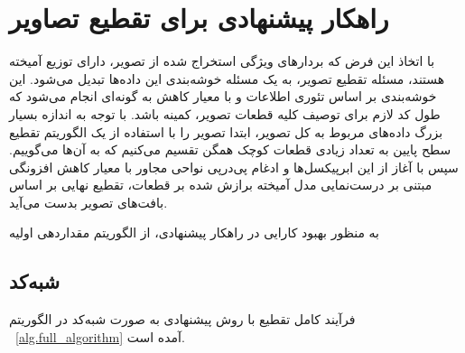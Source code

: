 \chapter{راهکار پیشنهادی برای تقطیع تصاویر}
\label{ch:proposedMethod}
با اتخاذ این فرض که بردارهای ویژگی استخراج شده از تصویر، دارای توزیع آمیخته
هستند، مسئله تقطیع تصویر، به یک مسئله خوشه‌بندی این داده‌ها تبدیل می‌شود.
این خوشه‌بندی بر اساس تئوری اطلاعات و با معیار کاهش
{}
به گونه‌ای انجام می‌شود که طول کد لازم برای توصیف کلیه قطعات تصویر، کمینه باشد.
با توجه به اندازه بسیار بزرگ داده‌های مربوط به کل تصویر، ابتدا تصویر را با استفاده از یک الگوریتم تقطیع سطح پایین به تعداد زیادی قطعات کوچک همگن تقسیم می‌کنیم که به آن‌ها
{}
می‌گوییم.
سپس با آغاز از این ابرپیکسل‌ها و ادغام پی‌درپی نواحی مجاور با معیار کاهش افزونگی
مبتنی بر درست‌نمایی مدل آمیخته برازش شده بر قطعات، تقطیع نهایی بر اساس بافت‌های تصویر بدست می‌آید.

به منظور بهبود کارایی در راهکار پیشنهادی، از الگوریتم مقداردهی اولیه\section{شبه‌کد}
فرآیند کامل تقطیع با روش پیشنهادی به صورت شبه‌کد در الگوریتم%
~\ref{alg.full_algorithm}
آمده است.

